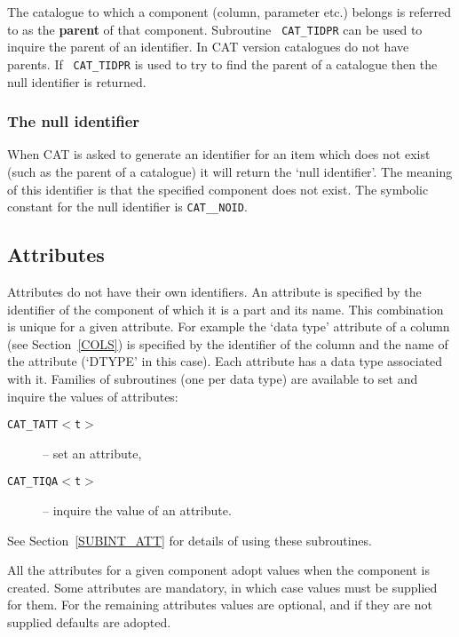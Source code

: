 The catalogue to which a component (column, parameter etc.) belongs is
referred to as the {\bf parent} of that component. Subroutine {\tt
CAT\_TIDPR} can be used to inquire the parent of an identifier. In
CAT version \CATversion catalogues do not have parents. If {\tt
CAT\_TIDPR} is used to try to find the parent of a catalogue then the
null identifier is returned.

\subsubsection{The null identifier}

When CAT is asked to generate an identifier for an item which does not
exist (such as the parent of a catalogue) it will return the `null
identifier'. The meaning of this identifier is that the specified
component does not exist. The symbolic constant for the null identifier
is {\tt CAT\_\_NOID}.


\subsection{Attributes}

Attributes do not have their own identifiers. An attribute is
specified by the identifier of the component of which it is a part and
its name. This combination is unique for a given attribute. For example
the `data type' attribute of a column (see Section~\ref{COLS}) is
specified by the identifier of the column and the name of the attribute
(`DTYPE' in this case). Each attribute has a data type associated with
it. Families of subroutines (one per data type) are available to set
and inquire the values of attributes:

\begin{description}

  \item[{\tt CAT\_TATT$<$t$>$}] -- set an attribute,

  \item[{\tt CAT\_TIQA$<$t$>$} ] -- inquire the value of an attribute.

\end{description}

See Section~\ref{SUBINT_ATT} for details of using these subroutines.

All the attributes for a given component adopt values when the component
is created. Some attributes are mandatory, in which case values must
be supplied for them. For the remaining attributes values are optional,
and if they are not supplied defaults are adopted.

